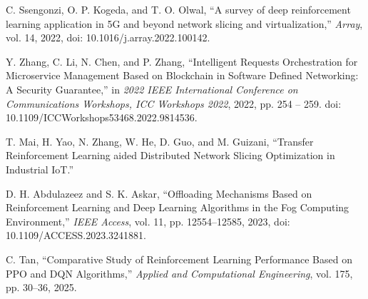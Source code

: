  C. Ssengonzi, O. P. Kogeda, and T. O. Olwal, ``A survey of deep reinforcement learning application in 5G and beyond network slicing and virtualization,'' \emph{Array}, vol. 14, 2022, doi: 10.1016/j.array.2022.100142.

 Y. Zhang, C. Li, N. Chen, and P. Zhang, ``Intelligent Requests Orchestration for Microservice Management Based on Blockchain in Software Defined Networking: A Security Guarantee,'' in \emph{2022 IEEE International Conference on Communications Workshops, ICC Workshops 2022}, 2022, pp. 254 -- 259. doi: 10.1109/ICCWorkshops53468.2022.9814536.

 T. Mai, H. Yao, N. Zhang, W. He, D. Guo, and M. Guizani, ``Transfer Reinforcement Learning aided Distributed Network Slicing Optimization in Industrial IoT.''

 D. H. Abdulazeez and S. K. Askar, ``Offloading Mechanisms Based on Reinforcement Learning and Deep Learning Algorithms in the Fog Computing Environment,'' \emph{IEEE Access}, vol. 11, pp. 12554--12585, 2023, doi: 10.1109/ACCESS.2023.3241881.

 C. Tan, ``Comparative Study of Reinforcement Learning Performance Based on PPO and DQN Algorithms,'' \emph{Applied and Computational Engineering}, vol. 175, pp. 30--36, 2025.

~
